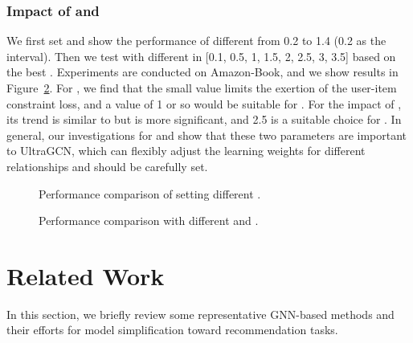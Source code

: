\documentclass[sigconf,authorversion]{acmart}
\begin{document}
\subsubsection{Impact of  and }
We first set  and show the performance of different  from 0.2 to 1.4 (0.2 as the interval). Then we test with different  in [0.1, 0.5, 1, 1.5, 2, 2.5, 3, 3.5] based on the best . Experiments are conducted on Amazon-Book, and we show results in Figure~\ref{param_lambda_gamma}.
For , we find that the small value limits the exertion of the user-item constraint loss, and a value of 1 or so would be suitable for .
For the impact of , its trend is similar to  but is more significant, and 2.5 is a suitable choice for . In general, our investigations for  and  show that these two parameters are important to UltraGCN, which can flexibly adjust the learning weights for different relationships and should be carefully set.  
 
 
\begin{figure}[!t]
	\centering  {}
	\vspace{-2ex}
	\caption{Performance comparison of setting different .}
	\vspace{-2ex}
	\label{param_k}
\end{figure}



\begin{figure}[!t]
	\centering  {}
	\vspace{-2ex}	
	\caption{Performance comparison with different  and .}
	\label{param_lambda_gamma}
\end{figure}























 \section{Related Work}
In this section, we briefly review some representative GNN-based methods and their efforts for model simplification toward recommendation tasks.
\end{document}
